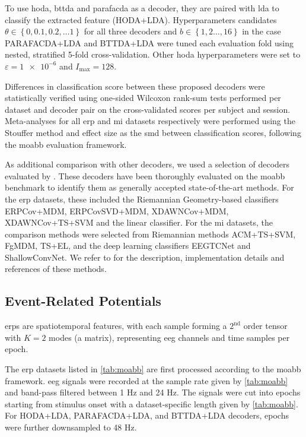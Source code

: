 \documentclass[twocolumn]{article}
\begin{document}
To use \ac{hoda}, \ac{bttda} and \ac{parafacda} as a decoder, they are paired with \ac{lda} to classify the
extracted feature (HODA+LDA).
Hyperparameters candidates $\theta \in \left\{0, 0.1, 0.2, \ldots 1\right\}$
for all three decoders and $b \in\left\{1,2\ldots,16\right\}$ in the case
PARAFACDA+LDA and BTTDA+LDA
were tuned each evaluation fold using nested, stratified 5-fold cross-validation.
Other \ac{hoda} hyperparameters were set to $\varepsilon=\num{1e-6}$ and $I_\text{max}=128$.

Differences in classification score between these proposed decoders
were statistically verified using one-sided Wilcoxon rank-sum tests performed per
dataset and decoder
pair on the cross-validated scores per subject and session.
Meta-analyses for all \ac{erp} and \ac{mi} datasets respectively
were performed using the Stouffer method and effect size as the \ac{smd} between classification scores, following the \ac{moabb} evaluation framework.

As additional comparison with other decoders, we used a selection of decoders
evaluated by \textcite{Chevallier2024}.
These decoders have been thoroughly evaluated on the \ac{moabb} benchmark to
identify them as generally accepted state-of-the-art methods.
For the \ac{erp} datasets, these included the Riemannian Geometry-based
classifiers ERPCov+MDM, ERPCovSVD+MDM, XDAWNCov+MDM, XDAWNCov+TS+SVM and the linear
classifier.
For the \ac{mi} datasets, the comparison methods were selected from Riemannian
methods ACM+TS+SVM, FgMDM, TS+EL, and the deep learning classifiers EEGTCNet
and ShallowConvNet.
We refer to \textcite{Chevallier2024} for the description, implementation details
and references of these methods.

\subsection{Event-Related Potentials}
\Acp{erp} are spatiotemporal features, with each sample forming a $2^\text{nd}$
order tensor with $K=2$ modes (a matrix), representing \ac{eeg} channels and time samples
per epoch.

The \ac{erp} datasets listed in \cref{tab:moabb}
are first processed according to the \ac{moabb} framework.
\Ac{eeg} signals were recorded at the sample rate given
by \cref{tab:moabb} and band-pass filtered between 1 Hz
and 24 Hz.
The signals were cut into epochs starting from stimulus onset with a
dataset-specific length given by \cref{tab:moabb}.
For HODA+LDA, PARAFACDA+LDA, and BTTDA+LDA decoders, epochs were further
downsampled to 48 Hz.
\end{document}
